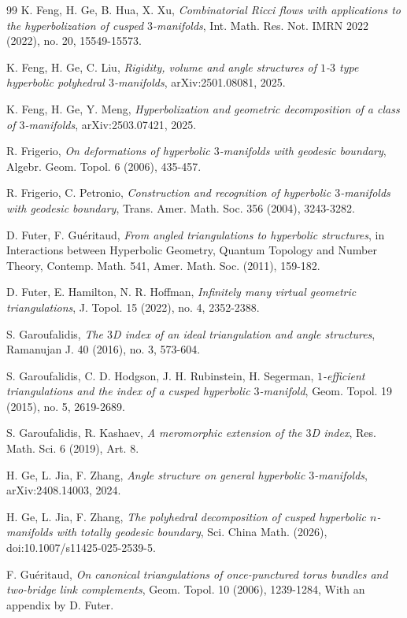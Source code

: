 \documentclass[oneside,a4paper,12pt]{article}
\theoremstyle{plain}
\theoremstyle{definition}
\theoremstyle{remark}
\numberwithin{equation}{section}
\begin{document}
\begin{thebibliography}{99}
K. Feng, H. Ge, B. Hua, X. Xu,
\emph{Combinatorial Ricci flows with applications to the hyperbolization of cusped $3$-manifolds},
Int. Math. Res. Not. IMRN 2022 (2022), no. 20, 15549-15573.

K. Feng, H. Ge, C. Liu,
\emph{Rigidity, volume and angle structures of $1$-$3$ type hyperbolic polyhedral $3$-manifolds},
arXiv:2501.08081, 2025.

K. Feng, H. Ge, Y. Meng,
\emph{Hyperbolization and geometric decomposition of a class of $3$-manifolds},
arXiv:2503.07421, 2025.


R. Frigerio,
\emph{On deformations of hyperbolic $3$-manifolds with geodesic boundary},
Algebr. Geom. Topol. 6 (2006), 435-457.

R. Frigerio, C. Petronio,
\emph{Construction and recognition of hyperbolic $3$-manifolds with geodesic boundary},
Trans. Amer. Math. Soc. 356 (2004), 3243-3282.

D. Futer, F. Gu\'{e}ritaud,
\emph{From angled triangulations to hyperbolic structures},
in Interactions between Hyperbolic Geometry,
Quantum Topology and Number Theory,
Contemp. Math. 541, Amer. Math. Soc. (2011),
159-182.

D. Futer, E. Hamilton, N. R. Hoffman,
\emph{Infinitely many virtual geometric triangulations},
J. Topol. 15 (2022), no. 4, 2352-2388.

S. Garoufalidis,
\emph{The $3$D index of an ideal triangulation and angle structures},
Ramanujan J. 40 (2016), no. 3, 573-604.

S. Garoufalidis, C. D. Hodgson, J. H. Rubinstein,
H. Segerman,
\emph{$1$-efficient triangulations and the index of a cusped hyperbolic $3$-manifold},
Geom. Topol. 19 (2015), no. 5, 2619-2689.

S. Garoufalidis, R. Kashaev,
\emph{A meromorphic extension of the $3$D index},
Res. Math. Sci. 6 (2019), Art. 8.

H. Ge, L. Jia, F. Zhang,
\emph{Angle structure on general hyperbolic $3$-manifolds},
arXiv:2408.14003, 2024.

H. Ge, L. Jia, F. Zhang,
\emph{The polyhedral decomposition of cusped hyperbolic $n$-manifolds with totally geodesic boundary},
Sci. China Math. (2026),
doi:10.1007/s11425-025-2539-5.

F. Gu\'eritaud,
\emph{On canonical triangulations of once-punctured torus bundles and two-bridge link complements}, Geom. Topol. 10 (2006), 1239-1284, With an appendix by D. Futer.



\end{thebibliography}
\end{document}
